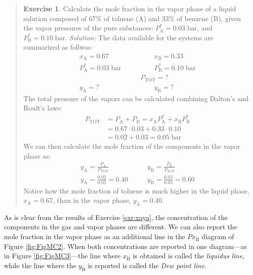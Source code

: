 \documentclass[
  9pt,
]{extbook}
\theoremstyle{definition}
\theoremstyle{definition}
\theoremstyle{definition}
\newtheorem{exercise}{Exercise}[chapter]
\theoremstyle{remark}
\begin{document}
\begin{quote}
\begin{exercise}
\protect\hypertarget{exr:xaya}{}{\label{exr:xaya} }Calculate the mole fraction in the vapor phase of a liquid solution composed of 67\% of toluene (\(\mathrm{A}\)) and 33\% of benzene (\(\mathrm{B}\)), given the vapor pressures of the pure substances: \(P_{\text{A}}^*=0.03\;\text{bar}\), and \(P_{\text{B}}^*=0.10\;\text{bar}\).
\emph{Solution:} The data available for the systems are summarized as follwos:
\begin{equation}
\begin{aligned}
x_{\text{A}}=0.67  \qquad & \qquad x_{\text{B}}=0.33 \\
P_{\text{A}}^* = 0.03\;\text{bar} \qquad & \qquad P_{\text{B}}^* = 0.10\;\text{bar} \\
& P_{\text{TOT}} = ? \\
y_{\text{A}}=? \qquad & \qquad y_{\text{B}}=?
\end{aligned}
\label{eq:mc2}
\end{equation}
The total pressure of the vapors can be calculated combining Dalton's and Roult's laws:
\begin{equation}
\begin{aligned}
P_{\text{TOT}} &= P_{\text{A}}+P_{\text{B}}=x_{\text{A}} P_{\text{A}}^* + x_{\text{B}} P_{\text{B}}^* \\
&= 0.67\cdot 0.03+0.33\cdot 0.10 \\
&= 0.02 + 0.03 = 0.05 \;\text{bar}
\end{aligned}
\label{eq:mc3}
\end{equation}
We can then calculate the mole fraction of the components in the vapor phase as:
\begin{equation}
\begin{aligned}
y_{\text{A}}=\frac{P_{\text{A}}}{P_{\text{TOT}}} & \qquad y_{\text{B}}=\frac{P_{\text{B}}}{P_{\text{TOT}}} \\
y_{\text{A}}=\frac{0.02}{0.05}=0.40 & \qquad y_{\text{B}}=\frac{0.03}{0.05}=0.60
\end{aligned}
\label{eq:mc4}
\end{equation}
Notice how the mole fraction of toluene is much higher in the liquid phase, \(x_{\text{A}}=0.67\), than in the vapor phase, \(y_{\text{A}}=0.40\).
\end{exercise}
\end{quote}

As is clear from the results of Exercise \ref{exr:xaya}, the concentration of the components in the gas and vapor phases are different. We can also report the mole fraction in the vapor phase as an additional line in the \(Px_{\text{B}}\) diagram of Figure \ref{fig:FigMC2}. When both concentrations are reported in one diagram---as in Figure \ref{fig:FigMC3}---the line where \(x_{\text{B}}\) is obtained is called the \emph{liquidus line}, while the line where the \(y_{\text{B}}\) is reported is called the \emph{Dew point line}.
\end{document}
